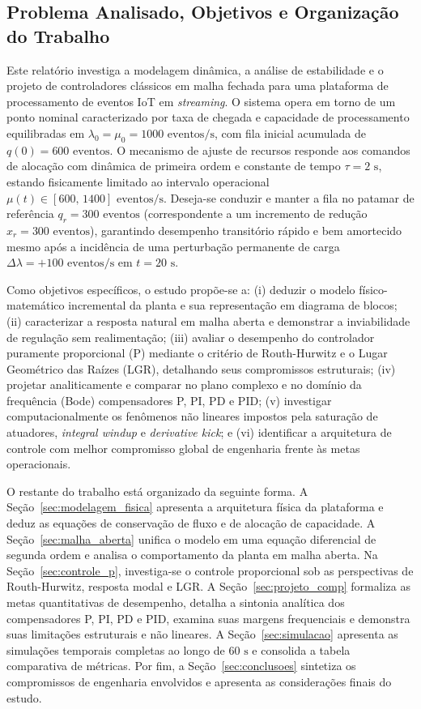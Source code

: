 \subsection{Problema Analisado, Objetivos e Organização do Trabalho}\label{sec:intro_objetivos}
Este relatório investiga a modelagem dinâmica, a análise de estabilidade e o projeto de controladores clássicos em malha fechada para uma plataforma de processamento de eventos IoT em \textit{streaming}. O sistema opera em torno de um ponto nominal caracterizado por taxa de chegada e capacidade de processamento equilibradas em $\lambda_0 = \mu_0 = 1000\text{ eventos/s}$, com fila inicial acumulada de $q(0) = 600\text{ eventos}$. O mecanismo de ajuste de recursos responde aos comandos de alocação com dinâmica de primeira ordem e constante de tempo $\tau = 2\text{ s}$, estando fisicamente limitado ao intervalo operacional $\mu(t) \in [600,\,1400]\text{ eventos/s}$. Deseja-se conduzir e manter a fila no patamar de referência $q_r = 300\text{ eventos}$ (correspondente a um incremento de redução $x_r = 300\text{ eventos}$), garantindo desempenho transitório rápido e bem amortecido mesmo após a incidência de uma perturbação permanente de carga $\Delta\lambda = +100\text{ eventos/s}$ em $t = 20\text{ s}$.

Como objetivos específicos, o estudo propõe-se a: (i) deduzir o modelo físico-matemático incremental da planta e sua representação em diagrama de blocos; (ii) caracterizar a resposta natural em malha aberta e demonstrar a inviabilidade de regulação sem realimentação; (iii) avaliar o desempenho do controlador puramente proporcional (P) mediante o critério de Routh-Hurwitz e o Lugar Geométrico das Raízes (LGR), detalhando seus compromissos estruturais; (iv) projetar analiticamente e comparar no plano complexo e no domínio da frequência (Bode) compensadores P, PI, PD e PID; (v) investigar computacionalmente os fenômenos não lineares impostos pela saturação de atuadores, \textit{integral windup} e \textit{derivative kick}; e (vi) identificar a arquitetura de controle com melhor compromisso global de engenharia frente às metas operacionais.

O restante do trabalho está organizado da seguinte forma. A Seção~\ref{sec:modelagem_fisica} apresenta a arquitetura física da plataforma e deduz as equações de conservação de fluxo e de alocação de capacidade. A Seção~\ref{sec:malha_aberta} unifica o modelo em uma equação diferencial de segunda ordem e analisa o comportamento da planta em malha aberta. Na Seção~\ref{sec:controle_p}, investiga-se o controle proporcional sob as perspectivas de Routh-Hurwitz, resposta modal e LGR. A Seção~\ref{sec:projeto_comp} formaliza as metas quantitativas de desempenho, detalha a sintonia analítica dos compensadores P, PI, PD e PID, examina suas margens frequenciais e demonstra suas limitações estruturais e não lineares. A Seção~\ref{sec:simulacao} apresenta as simulações temporais completas ao longo de $60\text{ s}$ e consolida a tabela comparativa de métricas. Por fim, a Seção~\ref{sec:conclusoes} sintetiza os compromissos de engenharia envolvidos e apresenta as considerações finais do estudo.
